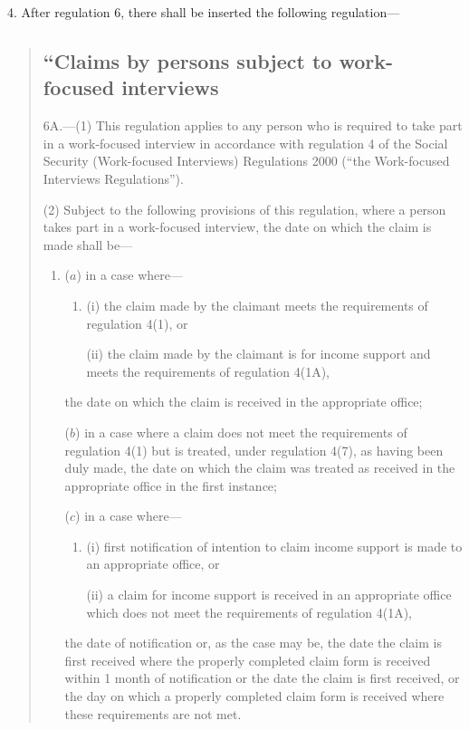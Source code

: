\documentclass[12pt,a4paper]{article}
\begin{document}
4.  After regulation 6, there shall be inserted the following regulation—
\begin{quotation}
\subsection*{“Claims by persons subject to work-focused interviews}

6A.---(1)  This regulation applies to any person who is required to take part in a work-focused interview in accordance with regulation 4 of the Social Security (Work-focused Interviews) Regulations 2000 (“the Work-focused Interviews Regulations”).

(2) Subject to the following provisions of this regulation, where a person takes part in a work-focused interview, the date on which the claim is made shall be—
\begin{enumerate}\item[]
($a$) in a case where—
\begin{enumerate}\item[]
(i) the claim made by the claimant meets the requirements of regulation 4(1), or

(ii) the claim made by the claimant is for income support and meets the requirements of regulation 4(1A),
\end{enumerate}
the date on which the claim is received in the appropriate office;

($b$) in a case where a claim does not meet the requirements of regulation 4(1) but is treated, under regulation 4(7), as having been duly made, the date on which the claim was treated as received in the appropriate office in the first instance;

($c$) in a case where—
\begin{enumerate}\item[]
(i) first notification of intention to claim income support is made to an appropriate office, or

(ii) a claim for income support is received in an appropriate office which does not meet the requirements of regulation 4(1A),
\end{enumerate}
the date of notification or, as the case may be, the date the claim is first received where the properly completed claim form is received within 1 month of notification or the date the claim is first received, or the day on which a properly completed claim form is received where these requirements are not met.
\end{enumerate}


\end{quotation}
\end{document}
